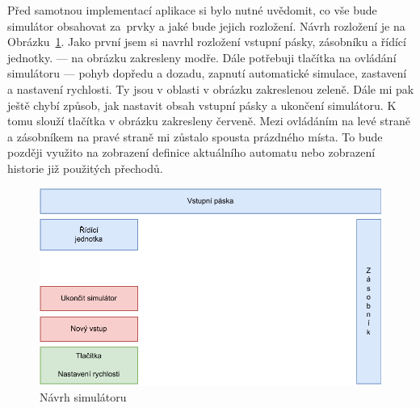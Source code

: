 Před samotnou implementací aplikace si bylo nutné uvědomit, co vše bude simulátor obsahovat za~prvky a jaké bude jejich rozložení. Návrh rozložení je na Obrázku~\ref{fig:SimulatorPageDesign}. Jako první jsem si navrhl rozložení vstupní pásky, zásobníku a řídící jednotky. --- na obrázku zakresleny modře. Dále potřebuji tlačítka na ovládání simulátoru --- pohyb dopředu a dozadu, zapnutí automatické simulace, zastavení a nastavení rychlosti. Ty jsou v oblasti v obrázku zakreslenou zeleně. Dále mi pak ještě chybí způsob, jak nastavit obsah vstupní pásky a ukončení simulátoru. K tomu slouží tlačítka v obrázku zakresleny červeně. Mezi ovládáním na levé straně a zásobníkem na pravé straně mi zůstalo spousta prázdného místa. To bude později využito na zobrazení definice aktuálního automatu nebo zobrazení historie již použitých přechodů.

\begin{figure}[h]
    \centering
    \includegraphics{Figures/SimulatoPageDesign.drawio.pdf}
    \caption{Návrh simulátoru}\label{fig:SimulatorPageDesign}
\end{figure}

\endinput